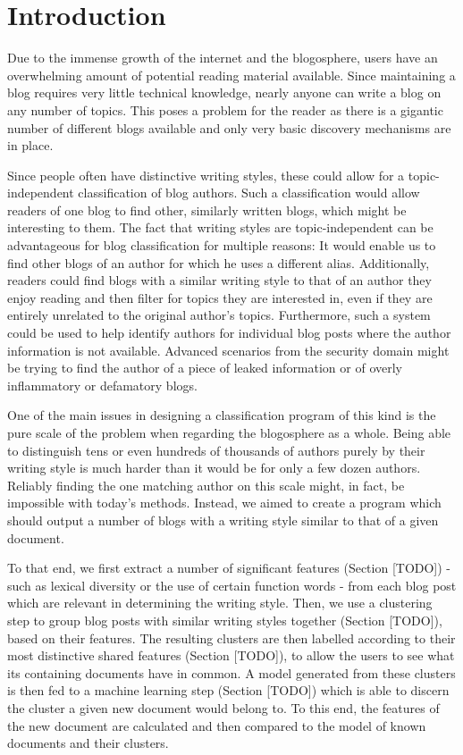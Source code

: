 
\section{Introduction}
\label{sec:introduction}

Due to the immense growth of the internet and the blogosphere, users have an overwhelming amount of potential reading material available.
Since maintaining a blog requires very little technical knowledge, nearly anyone can write a blog on any number of topics.
This poses a problem for the reader as there is a gigantic number of different blogs available and only very basic discovery mechanisms are in place.


Since people often have distinctive writing styles, these could allow for a topic-independent classification of blog authors.
Such a classification would allow readers of one blog to find other, similarly written blogs, which might be interesting to them.
The fact that writing styles are topic-independent can be advantageous for blog classification for multiple reasons: It would enable us to find other blogs of an author for which he uses a different alias.
Additionally, readers could find blogs with a similar writing style to that of an author they enjoy reading and then filter for topics they are interested in, even if they are entirely unrelated to the original author's topics.
Furthermore, such a system could be used to help identify authors for individual blog posts where the author information is not available.
Advanced scenarios from the security domain might be trying to find the author of a piece of leaked information or of overly inflammatory or defamatory blogs.


One of the main issues in designing a classification program of this kind is the pure scale of the problem when regarding the blogosphere as a whole.
Being able to distinguish tens or even hundreds of thousands of authors purely by their writing style is much harder than it would be for only a few dozen authors.
Reliably finding the one matching author on this scale might, in fact, be impossible with today's methods.
Instead, we aimed to create a program which should output a number of blogs with a writing style similar to that of a given document.


To that end, we first extract a number of significant features (Section [TODO]) - such as lexical diversity or the use of certain function words - from each blog post which are relevant in determining the writing style.
Then, we use a clustering step to group blog posts with similar writing styles together (Section [TODO]), based on their features.
The resulting clusters are then labelled according to their most distinctive shared features (Section [TODO]), to allow the users to see what its containing documents have in common.
A model generated from these clusters is then fed to a machine learning step (Section [TODO]) which is able to discern the cluster a given new document would belong to.
To this end, the features of the new document are calculated and then compared to the model of known documents and their clusters.


